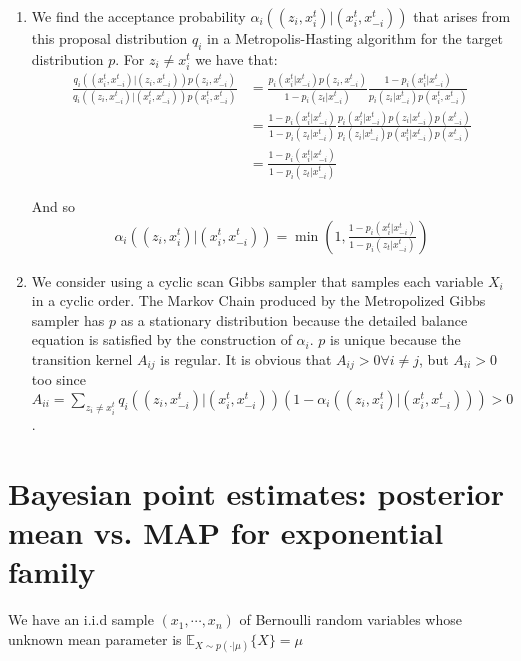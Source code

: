 \documentclass[paper=a4, fontsize=11pt]{scrartcl} %
\numberwithin{equation}{section} %
\numberwithin{figure}{section} %
\numberwithin{table}{section} %
\begin{document}
\begin{enumerate}
	\item We find the acceptance probability $\alpha_i ((z_i , x^t_{i} )|(x^t_{i} ,x^t_{-i}))$ that arises from this proposal distribution $q_i$ in a Metropolis-Hasting algorithm for the target distribution $p$. For $z_i \ne x_i^{t}$ we have that:
	\begin{align*}
	\frac{q_i((x^t_i, x^t_{-i})| (z_i, x^t_{-i}))p(z_i,x^t_{-i}) }{q_i( (z_i, x^t_{-i})| (x^t_i, x^t_{-i}))p(x^t_{i} ,x^t_{-i})}
	&= \frac{p_i( x^{t}_i | x^t_{-i} )p(z_i,x^t_{-i})}{1-p_i( z_t | x^t_{-i} )}\frac{1-p_i( x^{t}_i | x^t_{-i} )}{p_i( z_i | x^t_{-i} )p(x^{t}_i,x^t_{-i})}\\
	&=\frac{1-p_i( x^{t}_i | x^t_{-i} )}{1-p_i( z_t | x^t_{-i} )}\frac{p_i( x^{t}_i | x^t_{-i} )p(z_i|x^t_{-i})p(x^t_{-i})}{p_i( z_i | x^t_{-i} )p(x^{t}_i|x^t_{-i})p(x^t_{-i})}\\
	&=\frac{1-p_i( x^{t}_i | x^t_{-i} )}{1-p_i( z_t | x^t_{-i} )}
	\end{align*}
	
	And so
	\begin{align*}
	\alpha_i ((z_i , x^t_{i} )|(x^t_{i} ,x^t_{-i})) = \min\left(1, \frac{1-p_i( x^{t}_i | x^t_{-i} )}{1-p_i( z_t | x^t_{-i} )}\right)
	\end{align*}
	
	\item We consider using a cyclic scan Gibbs sampler that samples each variable $X_i$ in a cyclic order. The Markov Chain produced by the Metropolized Gibbs sampler has $p$ as a stationary distribution because the detailed balance equation is satisfied by the construction of $\alpha_i$. $p$ is unique because the transition kernel $A_{ij}$ is regular. It is obvious that $A_{ij}>0 \forall i \ne j$, but $A_{ii}>0$ too since $A_{ii} = \sum_{z_i \ne x^t_{i}} q_i( (z_i, x^t_{-i})| (x^t_i, x^t_{-i}))(1-\alpha_i ((z_i , x^t_{i} )|(x^t_{i} ,x^t_{-i})))>0$.
\end{enumerate}

\section{Bayesian point estimates: posterior mean vs. MAP for exponential family}

We have an i.i.d sample $(x_1, \cdots, x_n)$ of Bernoulli random variables whose unknown mean parameter is \(\mathbb{E}_{X\sim p(\cdot | \mu)}\{X\} = \mu\)
\end{document}
